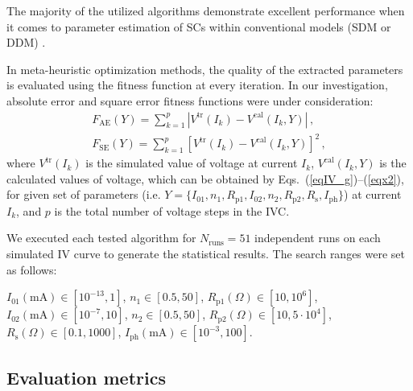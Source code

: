 \documentclass[a4paper,fleqn]{cas-sc}
\begin{document}
The majority of the utilized algorithms demonstrate excellent performance when
it comes to parameter estimation of SCs within conventional models (SDM or DDM) \cite{CWOA,DEWang,GOTLBO,IJAYA,MABC,PSO,STLBO,TLBO_Patel,LSHADE,IWOA}.

In meta-heuristic optimization methods, the quality of the extracted parameters is evaluated using the fitness function at
every iteration.
In our investigation, absolute error and square error fitness functions were under consideration:
\begin{gather}
\label{eqFae}
F_\mathrm{AE}(Y)= \sum_{k=1}^p \left|V^\mathrm{tr}(I_k)-V^\mathrm{cal}(I_k,Y)\right|\,,\\
\label{eqFse}
F_\mathrm{SE}(Y)= \sum_{k=1}^p \left[V^\mathrm{tr}(I_k)-V^\mathrm{cal}(I_k,Y)\right]^2\,,
\end{gather}
where
$V^\mathrm{tr}(I_k)$ is the simulated value of voltage at current $I_k$,
$V^\mathrm{cal}(I_k,Y)$ is the calculated values of voltage, which can be obtained
by Eqs.~(\ref{eqIV_g})--(\ref{eqx2}),
for given set of parameters (i.e. $Y = \{I_{01},n_1,R_\mathrm{p1},I_{02},n_2,R_\mathrm{p2},R_\mathrm{s},I_\mathrm{ph}\}$)
at current $I_k$,
and $p$ is the total number of voltage steps in the IVC.



We executed each tested algorithm for $N_\mathrm{runs}=51$ independent runs on each simulated IV curve
to generate the statistical results.
The search ranges were set as follows:

\noindent
$I_{01}(\mathrm{mA})\in[10^{-13},1]$,
$n_1\in[0.5,50]$,
$R_\mathrm{p1}(\Omega)\in[10,10^6]$,
$I_{02}(\mathrm{mA})\in[10^{-7},10]$,
$n_2\in[0.5,50]$,
$R_\mathrm{p2}(\Omega)\in[10,5\cdot10^4]$,
$R_\mathrm{s}(\Omega)\in[0.1,1000]$,
$I_\mathrm{ph}(\mathrm{mA})\in[10^{-3},100]$.


\subsection{Evaluation metrics}\label{EvalCr}
\end{document}

